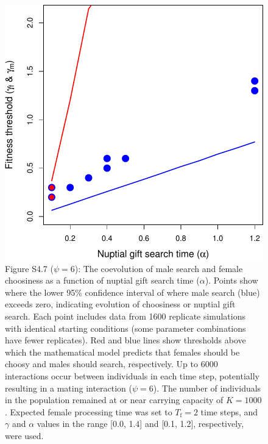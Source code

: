 \documentclass[
]{article}
\begin{document}
\captionsetup{labelformat=default}

\clearpage

\captionsetup{labelformat=empty}

\begin{figure}
\centering
\includegraphics{ms_refs_fixed_files/figure-latex/unnamed-chunk-12-1.pdf}
\caption{Figure S4.7 (\(\psi = 6\)): The coevolution of male search and
female choosiness as a function of nuptial gift search time
(\(\alpha\)). Points show where the lower 95\% confidence interval of
where male search (blue) exceeds zero, indicating evolution of
choosiness or nuptial gift search. Each point includes data from 1600
replicate simulations with identical starting conditions (some parameter
combinations have fewer replicates). Red and blue lines show thresholds
above which the mathematical model predicts that females should be
choosy and males should search, respectively. Up to 6000 interactions
occur between individuals in each time step, potentially resulting in a
mating interaction (\(\psi = 6\)). The number of individuals in the
population remained at or near carrying capacity of \(K = 1000\).
Expected female processing time was set to \(T_{\mathrm{f}}=2\) time
steps, and \(\gamma\) and \(\alpha\) values in the range {[}0.0, 1.4{]}
and {[}0.1, 1.2{]}, respectively, were used.}
\end{figure}
\end{document}
